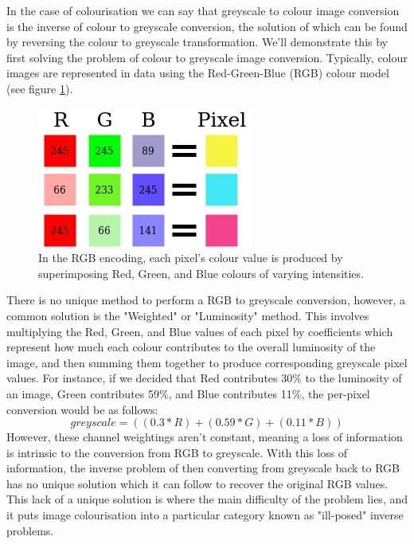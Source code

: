 \documentclass{l4proj}
\begin{document}
In the case of colourisation we can say that greyscale to colour image conversion is the inverse of colour to greyscale conversion, the solution of which can be found by reversing the colour to greyscale transformation. We'll demonstrate this by first solving the problem of colour to greyscale image conversion. Typically, colour images are represented in data using the Red-Green-Blue (RGB) colour model (see figure \ref{fig:rgb}). 
\begin{figure}[H]
    \centering
    \includegraphics[width=0.5\linewidth]{images/RGB.png}    

    \caption{In the RGB encoding, each pixel's colour value is produced by superimposing Red, Green, and Blue colours of varying intensities.}

    \label{fig:rgb} 
\end{figure}

There is no unique method to perform a RGB to greyscale conversion, however, a common solution is the "Weighted" or "Luminosity" method. This involves multiplying the Red, Green, and Blue values of each pixel by coefficients which represent how much each colour contributes to the overall luminosity of the image, and then summing them together to produce corresponding greyscale pixel values. For instance, if we decided that Red contributes 30\% to the luminosity of an image, Green contributes 59\%, and Blue contributes 11\%, the per-pixel conversion would be as follows:
\begin{equation}
    greyscale = ((0.3 * R) + (0.59 * G) + (0.11 * B))
\end{equation}
However, these channel weightings aren't constant, meaning a loss of information is intrinsic to the conversion from RGB to greyscale. With this loss of information, the inverse problem of then converting from greyscale back to RGB has no unique solution which it can follow to recover the original RGB values. This lack of a unique solution is where the main difficulty of the problem lies, and it puts image colourisation into a particular category known as "ill-posed" inverse problems.
\end{document}
